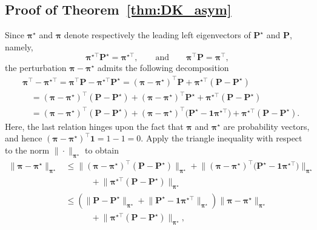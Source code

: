 \subsection{Proof of Theorem~\ref{thm:DK_asym}} \label{subsec:proof-DK-asym}

Since $\bm{\pi}^{\star}$ and $\bm{\pi}$ denote respectively the leading left eigenvectors of $\bm{P}^{\star}$ and $\bm{P}$, namely,
%
\[
\bm{\pi}^{\star\top}\bm{P}^{\star}=\bm{\pi}^{\star\top},\qquad\text{and}\qquad\bm{\pi}^{\top}\bm{P}=\bm{\pi}^{\top},
\]
%
the perturbation $\bm{\pi}-\bm{\pi}^{\star}$ admits the following decomposition
%
\begin{align*}
&\bm{\pi}^{\top}-\bm{\pi}^{\star\top}  =\bm{\pi}^{\top}\bm{P}-\bm{\pi}^{\star\top}\bm{P}^{\star}=\left(\bm{\pi}-\bm{\pi}^{\star}\right)^{\top}\bm{P}+\bm{\pi}^{\star\top}\left(\bm{P}-\bm{P}^{\star}\right)\\
 &\quad =\left(\bm{\pi}-\bm{\pi}^{\star}\right)^{\top}\left(\bm{P}-\bm{P}^{\star}\right)+\left(\bm{\pi}-\bm{\pi}^{\star}\right)^{\top}\bm{P}^{\star}+\bm{\pi}^{\star\top}\left(\bm{P}-\bm{P}^{\star}\right)\\
 &\quad =\left(\bm{\pi}-\bm{\pi}^{\star}\right)^{\top}\left(\bm{P}-\bm{P}^{\star}\right)
	+\left(\bm{\pi}-\bm{\pi}^{\star}\right)^{\top}\big(\bm{P}^{\star}-\bm{1}\bm{\pi}^{\star\top}\big) + \bm{\pi}^{\star\top}\left(\bm{P}-\bm{P}^{\star}\right).
\end{align*}
%
Here, the last relation hinges upon the fact that $\bm{\pi}$ and $\bm{\pi}^{\star}$
are probability vectors, and hence $\left(\bm{\pi}-\bm{\pi}^{\star}\right)^{\top}\bm{1}= 1 - 1 = 0$.
Apply the triangle inequality with respect to the norm $\|\cdot\|_{\bm{\pi}^{\star}}$ to obtain
%
\begin{align*}
\|\bm{\pi}-\bm{\pi}^{\star}\|_{\bm{\pi}^{\star}}
  & \leq \big\|\left(\bm{\pi}-\bm{\pi}^{\star}\right)^{\top}\left(\bm{P}-\bm{P}^{\star}\right) \big\|_{\bm{\pi}^{\star}}
	+ \big\|\left(\bm{\pi}-\bm{\pi}^{\star}\right)^{\top}\big(\bm{P}^{\star}-\bm{1}\bm{\pi}^{\star\top}\big) \big\|_{\bm{\pi}^{\star}} \nonumber\\
&\qquad\quad + \big\|\bm{\pi}^{\star\top}\left(\bm{P}-\bm{P}^{\star}\right) \big\|_{\bm{\pi}^{\star}}\nonumber \\
 & \leq\left( \|\bm{P}-\bm{P}^{\star}\|_{\bm{\pi}^{\star}}+ \big\|\bm{P}^{\star}-\bm{1}\bm{\pi}^{\star\top} \big\|_{\bm{\pi}^{\star}}\right)  \|\bm{\pi}-\bm{\pi}^{\star}\|_{\bm{\pi}^{\star}}\nonumber\\
 &\qquad\quad + \big\|\bm{\pi}^{\star\top}\left(\bm{P}-\bm{P}^{\star}\right) \big\|_{\bm{\pi}^{\star}},
\end{align*}
